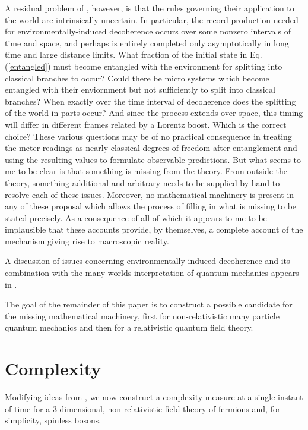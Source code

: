 \documentclass[12pt,amsmath,amssymb,onecolumn]{revtex4-2}
\begin{document}
A residual problem of \cite{Zeh, Zurek, Zurek1, Zurek2, Wallace, Riedel}, however, 
is that the rules governing their application to the world are intrinsically uncertain.
In particular, the record production needed for 
environmentally-induced decoherence occurs over some nonzero intervals of time
and space, and perhaps is entirely completed only asymptotically in 
long time and large distance limits.
What fraction of the initial state in Eq. (\ref{entangled})
must become entangled with the environment for splitting into
classical branches to occur?
Could there be micro systems which become entangled with their enviornment but
not sufficiently to split into classical branches?
When exactly over the time interval of decoherence does the splitting of the world in parts 
occur? And since the process extends over space, this timing will differ in different
frames related by a Lorentz boost. Which is the correct choice? 
These various questions may be
of no practical consequence in treating the meter readings as nearly classical
degrees of freedom after entanglement and using the resulting values to formulate observable predictions.
But what seems to me to be clear is that something is missing from the theory. From outside the theory,
something additional and arbitrary needs to be supplied by hand to resolve each of these issues.
Moreover, no mathematical machinery is present in any of these proposal
which allows the process of filling in what is missing to be stated precisely.
As a consequence of all of which it appears to me to be implausible that 
these accounts provide, by themselves, a complete account of
the mechanism giving rise to macroscopic reality.

A discussion of issues concerning environmentally induced decoherence
and its combination with the many-worlds interpretation of quantum mechanics
appears in \cite{Schlosshauer}.

The goal of the remainder of this paper
is to construct a possible candidate for the
missing mathematical machinery, first for non-relativistic 
many particle quantum mechanics and then for a
relativistic quantum field theory.




\section{\label{sec:complexity}Complexity}

Modifying ideas from \cite{Nielsen}, we now construct a complexity measure at a single instant of time
for a 3-dimensional, non-relativistic field theory
of fermions and, for simplicity, spinless bosons.  
\end{document}
